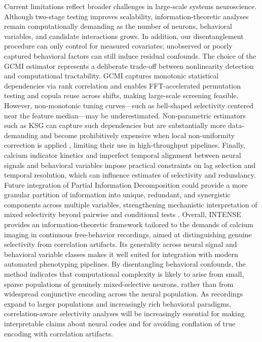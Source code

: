 Current limitations reflect broader challenges in large-scale systems neuroscience. Although two-stage testing improves scalability, information-theoretic analyses remain computationally demanding as the number of neurons, behavioral variables, and candidate interactions grows. In addition, our disentanglement procedure can only control for measured covariates; unobserved or poorly captured behavioral factors can still induce residual confounds. The choice of the GCMI estimator represents a deliberate trade-off between nonlinearity detection and computational tractability. GCMI captures monotonic statistical dependencies via rank correlation and enables FFT-accelerated permutation testing and copula reuse across shifts, making large-scale screening feasible. However, non-monotonic tuning curves---such as bell-shaped selectivity centered near the feature median---may be underestimated. Non-parametric estimators such as KSG \cite{Kraskov2004} can capture such dependencies but are substantially more data-demanding and become prohibitively expensive when local non-uniformity correction is applied \cite{Gao2015LNC}, limiting their use in high-throughput pipelines. 
Finally, calcium indicator kinetics and imperfect temporal alignment between neural signals and behavioral variables impose practical constraints on lag selection and temporal resolution, which can influence estimates of selectivity and redundancy. Future integration of Partial Information Decomposition could provide a more granular partition of information into unique, redundant, and synergistic components across multiple variables, strengthening mechanistic interpretation of mixed selectivity beyond pairwise and conditional tests \cite{Williams2010}.
Overall, INTENSE provides an information-theoretic framework tailored to the demands of calcium imaging in continuous free-behavior recordings, aimed at distinguishing genuine selectivity from correlation artifacts. Its generality across neural signal and behavioral variable classes makes it well suited for integration with modern automated phenotyping pipelines. By disentangling behavioral confounds, the method indicates that computational complexity is likely to arise from small, sparse populations of genuinely mixed-selective neurons, rather than from widespread conjunctive encoding across the neural population. As recordings expand to larger populations and increasingly rich behavioral paradigms, correlation-aware selectivity analyses will be increasingly essential for making interpretable claims about neural codes and for avoiding conflation of true encoding with correlation artifacts.
